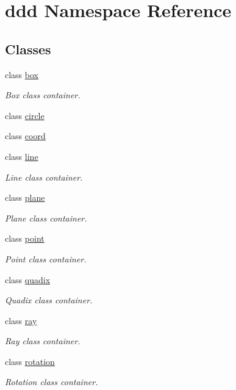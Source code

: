 \hypertarget{namespaceddd}{}\section{ddd Namespace Reference}
\label{namespaceddd}
\subsection*{Classes}
\begin{DoxyCompactItemize}
\item 
class \hyperlink{classddd_1_1box}{box}
\begin{DoxyCompactList}\small\item\em Box class container. \end{DoxyCompactList}\item 
class \hyperlink{classddd_1_1circle}{circle}
\item 
class \hyperlink{classddd_1_1coord}{coord}
\item 
class \hyperlink{classddd_1_1line}{line}
\begin{DoxyCompactList}\small\item\em Line class container. \end{DoxyCompactList}\item 
class \hyperlink{classddd_1_1plane}{plane}
\begin{DoxyCompactList}\small\item\em Plane class container. \end{DoxyCompactList}\item 
class \hyperlink{classddd_1_1point}{point}
\begin{DoxyCompactList}\small\item\em Point class container. \end{DoxyCompactList}\item 
class \hyperlink{classddd_1_1quadix}{quadix}
\begin{DoxyCompactList}\small\item\em Quadix class container. \end{DoxyCompactList}\item 
class \hyperlink{classddd_1_1ray}{ray}
\begin{DoxyCompactList}\small\item\em Ray class container. \end{DoxyCompactList}\item 
class \hyperlink{classddd_1_1rotation}{rotation}
\begin{DoxyCompactList}\small\item\em Rotation class container. \end{DoxyCompactList}\item 

\end{DoxyCompactItemize}
